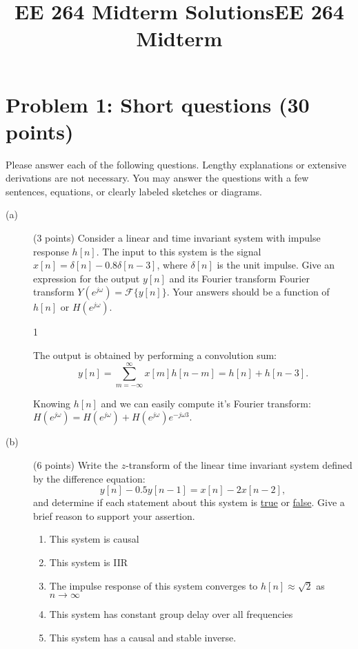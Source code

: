 \documentclass[10pt]{article}
\title{EE 264 Midterm Solutions}
\title{EE 264 Midterm}
\def\SOLUTIONS{0} %
\def\SolutionsColor{red2}
\begin{document}

\pagebreak

\section*{Problem 1: Short questions (30 points)}

Please answer each of the following questions. Lengthy explanations or extensive derivations are not necessary. You may answer the questions with a few sentences, equations, or clearly labeled sketches or diagrams.

\begin{description}
\item[(a)] (3 points) Consider a linear and time invariant system with impulse response $h[n]$. The input to this system is the signal $x[n] = \delta[n] - 0.8\delta[n-3]$, where $\delta[n]$ is the unit impulse. Give an expression for the output $y[n]$ and its Fourier transform Fourier transform $Y(e^{j\omega}) = \mathcal{F}\{y[n]\}$. Your answers should be a function of $h[n]$ or $H(e^{j\omega})$.

\if\SOLUTIONS1
{\color{\SolutionsColor} 
	The output is obtained by performing a convolution sum:
	\begin{equation}
		y[n] = \sum_{m=-\infty}^{\infty} x[m]h[n-m] = h[n] + h[n-3].
	\end{equation}
	
	Knowing $h[n]$ and we can easily compute it's Fourier transform: $H(e^{j\omega}) = H(e^{j\omega}) + H(e^{j\omega})e^{-j\omega 3}$.
}
\else\vspace{3cm}
\fi

%
\item[(b)] (6 points) Write the $z$-transform of the linear time invariant system defined by the difference equation:
\begin{equation}
y[n] - 0.5y[n-1] = x[n] - 2x[n-2],
\end{equation}
and determine if each statement about this system is \underline{true} or \underline{false}. Give a brief reason to support your assertion.

\begin{enumerate}\setlength\itemsep{2em}
  \item This system is causal
  \item This system is IIR
  \item The impulse response of this system converges to $h[n] \approx \sqrt{2}$ as $n\to \infty$
  \item This system has constant group delay over all frequencies
  \item This system has a causal and stable inverse.
\end{enumerate}


\end{description}
\end{document}

